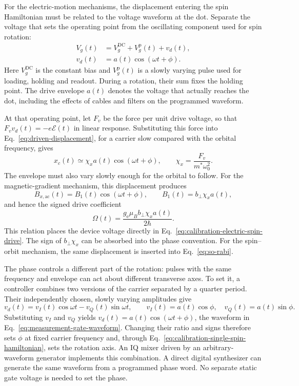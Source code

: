 For the electric-motion mechanisms, the displacement entering the spin
Hamiltonian must be related to the voltage waveform at the dot.
Separate the voltage that sets the operating point from the
oscillating component used for spin rotation:
\begin{equation}
 \begin{aligned}
 V_g(t)&=V_g^{\mathrm{DC}}+V_g^{\mathrm p}(t)+v_d(t),\\
 v_d(t)&=a(t)\cos(\omega t+\phi).
 \end{aligned}
 \label{eq:measurement-gate-waveform}
\end{equation}
Here $V_g^{\mathrm{DC}}$ is the constant bias and
$V_g^{\mathrm p}(t)$ is a slowly varying pulse used for loading,
holding and readout. During a rotation, their sum fixes the
holding point. The drive envelope $a(t)$ denotes the voltage
that actually reaches the dot, including the effects of cables
and filters on the programmed waveform.

At that operating point, let $F_v$ be the force per unit drive
voltage, so that $F_vv_d(t)=-e\mathcal E(t)$ in linear response.
Substituting this force into Eq.~\eqref{eq:driven-displacement},
for a carrier slow compared with the orbital frequency, gives
\[
 x_c(t)\simeq\chi_x a(t)\cos(\omega t+\phi),
 \qquad \chi_x=\frac{F_v}{m^*\omega_0^2}.
\]
The envelope must also vary slowly enough for the orbital to
follow. For the magnetic-gradient mechanism, this displacement
produces
\begin{equation}
 B_{x,\mathrm{ac}}(t)=B_1(t)\cos(\omega t+\phi),\qquad
 B_1(t)=b_\perp\chi_xa(t),
 \label{eq:calibration-transverse-field-from-voltage}
\end{equation}
and hence the signed drive coefficient
\[
 \Omega(t)=\frac{g_{\mathrm e}\mu_Bb_\perp\chi_xa(t)}{2\hbar}.
\]
This relation places the device voltage directly in
Eq.~\eqref{eq:calibration-electric-spin-drive}. The sign of
$b_\perp\chi_x$ can be absorbed into the phase convention. For
the spin--orbit mechanism, the same displacement is inserted into
Eq.~\eqref{eq:so-rabi}.

The phase controls a different part of the rotation: pulses with
the same frequency and envelope can act about different transverse
axes. To set it, a controller combines two versions of the carrier
separated by a quarter period. Their independently chosen,
slowly varying amplitudes give
\begin{equation}
 v_d(t)=v_I(t)\cos\omega t-v_Q(t)\sin\omega t,\qquad
 v_I(t)=a(t)\cos\phi,\quad
 v_Q(t)=a(t)\sin\phi.
 \label{eq:calibration-iq-phase-control}
\end{equation}
Substituting $v_I$ and $v_Q$ yields
$v_d(t)=a(t)\cos(\omega t+\phi)$, the waveform in
Eq.~\eqref{eq:measurement-gate-waveform}. Changing their ratio
and signs therefore sets $\phi$ at fixed carrier frequency and,
through Eq.~\eqref{eq:calibration-single-spin-hamiltonian}, sets
the rotation axis. An IQ mixer driven by an arbitrary-waveform
generator implements this combination. A direct digital
synthesizer can generate the same waveform from a programmed
phase word. No separate static gate voltage is needed to set
the phase.

